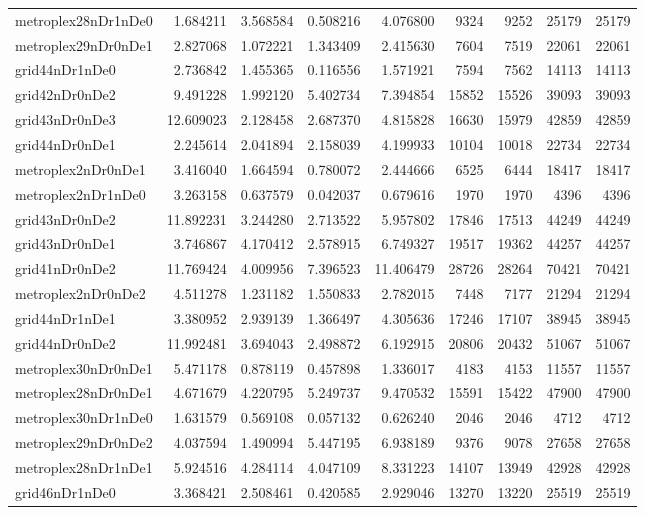 \begin{longtable}{|l|r|r|r|r|r|r|r|r|}
metroplex28nDr1nDe0 & 1.684211 & 3.568584 & 0.508216 & 4.076800 & 9324 & 9252 & 25179 & 25179 \\
metroplex29nDr0nDe1 & 2.827068 & 1.072221 & 1.343409 & 2.415630 & 7604 & 7519 & 22061 & 22061 \\
grid44nDr1nDe0 & 2.736842 & 1.455365 & 0.116556 & 1.571921 & 7594 & 7562 & 14113 & 14113 \\
grid42nDr0nDe2 & 9.491228 & 1.992120 & 5.402734 & 7.394854 & 15852 & 15526 & 39093 & 39093 \\
grid43nDr0nDe3 & 12.609023 & 2.128458 & 2.687370 & 4.815828 & 16630 & 15979 & 42859 & 42859 \\
grid44nDr0nDe1 & 2.245614 & 2.041894 & 2.158039 & 4.199933 & 10104 & 10018 & 22734 & 22734 \\
metroplex2nDr0nDe1 & 3.416040 & 1.664594 & 0.780072 & 2.444666 & 6525 & 6444 & 18417 & 18417 \\
metroplex2nDr1nDe0 & 3.263158 & 0.637579 & 0.042037 & 0.679616 & 1970 & 1970 & 4396 & 4396 \\
grid43nDr0nDe2 & 11.892231 & 3.244280 & 2.713522 & 5.957802 & 17846 & 17513 & 44249 & 44249 \\
grid43nDr0nDe1 & 3.746867 & 4.170412 & 2.578915 & 6.749327 & 19517 & 19362 & 44257 & 44257 \\
grid41nDr0nDe2 & 11.769424 & 4.009956 & 7.396523 & 11.406479 & 28726 & 28264 & 70421 & 70421 \\
metroplex2nDr0nDe2 & 4.511278 & 1.231182 & 1.550833 & 2.782015 & 7448 & 7177 & 21294 & 21294 \\
grid44nDr1nDe1 & 3.380952 & 2.939139 & 1.366497 & 4.305636 & 17246 & 17107 & 38945 & 38945 \\
grid44nDr0nDe2 & 11.992481 & 3.694043 & 2.498872 & 6.192915 & 20806 & 20432 & 51067 & 51067 \\
metroplex30nDr0nDe1 & 5.471178 & 0.878119 & 0.457898 & 1.336017 & 4183 & 4153 & 11557 & 11557 \\
metroplex28nDr0nDe1 & 4.671679 & 4.220795 & 5.249737 & 9.470532 & 15591 & 15422 & 47900 & 47900 \\
metroplex30nDr1nDe0 & 1.631579 & 0.569108 & 0.057132 & 0.626240 & 2046 & 2046 & 4712 & 4712 \\
metroplex29nDr0nDe2 & 4.037594 & 1.490994 & 5.447195 & 6.938189 & 9376 & 9078 & 27658 & 27658 \\
metroplex28nDr1nDe1 & 5.924516 & 4.284114 & 4.047109 & 8.331223 & 14107 & 13949 & 42928 & 42928 \\
grid46nDr1nDe0 & 3.368421 & 2.508461 & 0.420585 & 2.929046 & 13270 & 13220 & 25519 & 25519 \\

\end{longtable}
